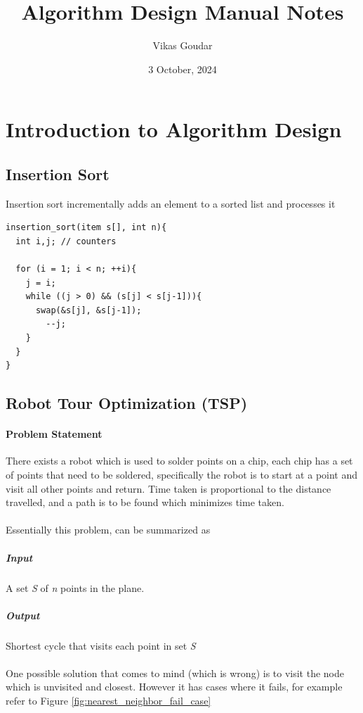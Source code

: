 \documentclass{article}
\title{Algorithm Design Manual Notes}
\author{Vikas Goudar}
\date{3 October, 2024}
\begin{document}
\maketitle

\newpage
\tableofcontents
\newpage

\section{Introduction to Algorithm Design}

\subsection{Insertion Sort}
Insertion sort incrementally adds an element to a sorted list and processes it
\begin{lstlisting}
insertion_sort(item s[], int n){
  int i,j; // counters 
    
  for (i = 1; i < n; ++i){
    j = i;
    while ((j > 0) && (s[j] < s[j-1])){
      swap(&s[j], &s[j-1]);
        --j;
    }
  }
}
\end{lstlisting}

\subsection{Robot Tour Optimization (TSP)}
\paragraph{Problem Statement}
There exists a robot which is used to solder points on a chip, each chip has a set of points that need to be soldered, specifically the robot is to start at a point and visit all other points and return.
Time taken is proportional to the distance travelled, and a path is to be found which minimizes time taken.

\paragraph{}
Essentially this problem, can be summarized as
\subparagraph{Input}
A set \textit{S} of \textit{n} points in the plane.
\subparagraph{Output}
Shortest cycle that visits each point in set \textit{S}

\paragraph{}
One possible solution that comes to mind (which is wrong) is to visit the node which is unvisited and closest.
However it has cases where it fails, for example refer to Figure \ref{fig:nearest_neighbor_fail_case}
\end{document}
